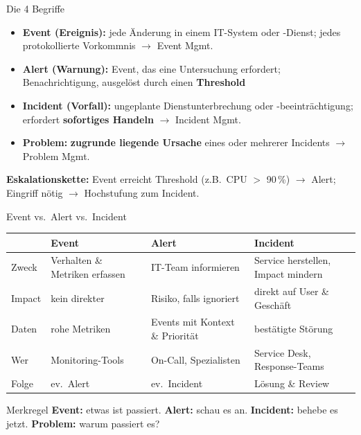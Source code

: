 \documentclass[a4paper, fontsize=7pt]{scrartcl}
\renewcommand*{\arraystretch}{1.5}  %
\begin{document}
\begin{mainbox}{Die 4 Begriffe}
\begin{itemize}
    \item \textbf{Event (Ereignis):} jede Änderung in einem IT-System oder
          -Dienst; jedes protokollierte Vorkommnis $\to$ Event Mgmt.
    \item \textbf{Alert (Warnung):} Event, das eine Untersuchung erfordert;
          Benachrichtigung, ausgelöst durch einen \textbf{Threshold}
    \item \textbf{Incident (Vorfall):} ungeplante Dienstunterbrechung oder
          -beeinträchtigung; erfordert \textbf{sofortiges Handeln} $\to$ Incident
          Mgmt.
    \item \textbf{Problem:} \textbf{zugrunde liegende Ursache} eines oder
          mehrerer Incidents $\to$ Problem Mgmt.
\end{itemize}
\textbf{Eskalationskette:} Event erreicht Threshold (z.B.\ CPU $>$ 90\,\%)
$\to$ Alert; Eingriff nötig $\to$ Hochstufung zum Incident.
\end{mainbox}

\begin{mainbox}{Event vs.\ Alert vs.\ Incident}
\renewcommand*{\arraystretch}{1.15}
\setlength{\tabcolsep}{2pt}
\footnotesize
\begin{tabularx}{\linewidth}{@{}l|>{\raggedright\arraybackslash}X|>{\raggedright\arraybackslash}X|>{\raggedright\arraybackslash}X@{}}
 & \textbf{Event} & \textbf{Alert} & \textbf{Incident} \\
\hline
Zweck & Verhal\-ten \& Metri\-ken erfassen & IT-Team informie\-ren & Service her\-stellen, Impact mindern \\
Impact & kein direkter & Risiko, falls ignoriert & direkt auf User \& Geschäft \\
Daten & rohe Metri\-ken & Events mit Kontext \& Priorität & bestä\-tigte Störung \\
Wer & Moni\-toring-Tools & On-Call, Spezia\-listen & Service Desk, Re\-sponse-Teams \\
Folge & ev.\ Alert & ev.\ Incident & Lösung \& Review \\
\end{tabularx}
\end{mainbox}

\begin{subbox}{Merkregel}
\textbf{Event:} etwas ist passiert. \textbf{Alert:} schau es an.
\textbf{Incident:} behebe es jetzt. \textbf{Problem:} warum passiert es?
\end{subbox}
\end{document}
